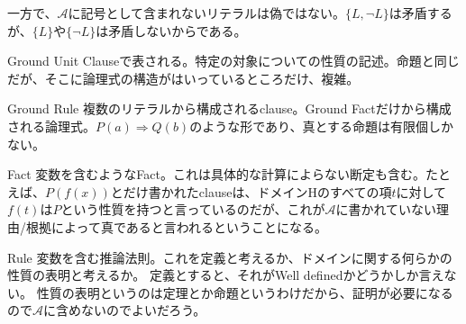 \documentclass[10pt, oneside]{jarticle}   	%
\begin{document}
一方で、$\mathcal{A}$に記号として含まれないリテラルは偽ではない。$\{L, \neg L\}$は矛盾するが、$\{ L\}$や$\{\neg L \}$は矛盾しないからである。


\begin{description}
\item[ Ground Fact] Ground Unit Clauseで表される。特定の対象についての性質の記述。命題と同じだが、そこに論理式の構造がはいっているところだけ、複雑。
\item{Ground Rule} 複数のリテラルから構成されるclause。Ground Factだけから構成される論理式。$P(a) ⇒ Q(b)$のような形であり、真とする命題は有限個しかない。
\item{Fact} 変数を含むようなFact。これは具体的な計算によらない断定も含む。たとえば、$P(f(x))$とだけ書かれたclauseは、ドメインHのすべての項$t$に対して$f(t)$は$P$という性質を持つと言っているのだが、これが$\mathcal{A}$に書かれていない理由/根拠によって真であると言われるということになる。
\item{Rule} 変数を含む推論法則。これを定義と考えるか、ドメインに関する何らかの性質の表明と考えるか。
定義とすると、それがWell definedかどうかしか言えない。
性質の表明というのは定理とか命題というわけだから、証明が必要になるので$\mathcal{A}$に含めないのでよいだろう。
\end{description}
\end{document}
